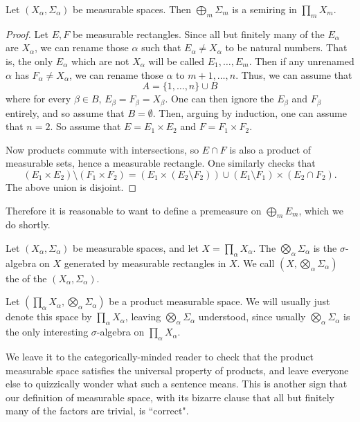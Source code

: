 \begin{lemma}
Let $(X_\alpha, \Sigma_\alpha)$ be measurable spaces.
Then $\bigoplus_{m} \Sigma_{m}$ is a semiring in $\prod_{m} X_{m}$.
\end{lemma}
\begin{proof}
Let $E, F$ be measurable rectangles.
Since all but finitely many of the $E_\alpha$ are $X_\alpha$, we can rename those $\alpha$ such that $E_{\alpha} \neq X_\alpha$ to be natural numbers.
That is, the only $E_\alpha$ which are not $X_\alpha$ will be called $E_1, \dots, E_{m}$.
Then if any unrenamed $\alpha$ has $F_{\alpha} \neq X_\alpha$, we can rename those $\alpha$ to $m+1, \dots, n$.
Thus, we can assume that
\[A = \{1, \dots, n\} \cup B\]
where for every $\beta \in B$, $E_{\beta} = F_{\beta} = X_\beta$.
One can then ignore the $E_\beta$ and $F_\beta$ entirely, and so assume that $B = \emptyset$.
Then, arguing by induction, one can assume that $n = 2$.
So assume that $E = E_1 \times E_2$ and $F = F_1 \times F_2$.

Now products commute with intersections, so $E \cap F$ is also a product of measurable sets, hence a measurable rectangle.
One similarly checks that
\[(E_1 \times E_2) \setminus (F_1 \times F_2) = (E_1 \times (E_2 \setminus F_2)) \cup (E_1 \setminus F_1) \times (E_2 \cap F_2).\]
The above union is disjoint.
\end{proof}

Therefore it is reasonable to want to define a premeasure on $\bigoplus_{m} E_{m}$, which we do shortly.

\begin{definition}
Let $(X_\alpha, \Sigma_\alpha)$ be measurable spaces, and let $X = \prod_{\alpha} X_\alpha$.
The  $\bigotimes_{\alpha} \Sigma_\alpha$ is the $\sigma$-algebra on $X$ generated by measurable rectangles in $X$.
We call $(X, \bigotimes_{\alpha} \Sigma_\alpha)$ the  of the $(X_\alpha, \Sigma_\alpha)$.
\end{definition}

Let $(\prod_{\alpha} X_\alpha, \bigotimes_{\alpha} \Sigma_\alpha)$ be a product measurable space. We will usually just denote this space by $\prod_{\alpha} X_\alpha$, leaving $\bigotimes_{\alpha} \Sigma_\alpha$ understood, since usually $\bigotimes_{\alpha} \Sigma_\alpha$ is the only interesting $\sigma$-algebra on $\prod_{\alpha} X_\alpha$.

We leave it to the categorically-minded reader to check that the product measurable space satisfies the universal property of products, and leave everyone else to quizzically wonder what such a sentence means.
This is another sign that our definition of measurable space, with its bizarre clause that all but finitely many of the factors are trivial, is ``correct".

